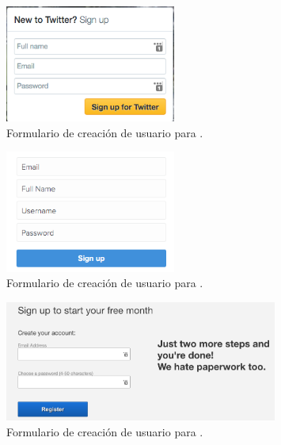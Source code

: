
\begin{figure}[H]
	\centering
	\includegraphics[width=0.5\textwidth]{figuras/account/examples/twitter_create_form.png}
	\caption{Formulario de creación de usuario para \twitterNAME.}
	\label{figure:apendice:account:example:twitter_create_form}
\end{figure}

\begin{figure}[H]
	\centering
	\includegraphics[width=0.5\textwidth]{figuras/account/examples/instagram_create_form.png}
	\caption{Formulario de creación de usuario para \instagramNAME.}
	\label{figure:apendice:account:example:instagram_create_form}
\end{figure}

\begin{figure}[H]
	\centering
	\includegraphics[width=0.8\textwidth]{figuras/account/examples/netflix_create_form.png}
	\caption{Formulario de creación de usuario para \netflixNAME.}
	\label{figure:apendice:account:example:netflix_create_form}
\end{figure}

